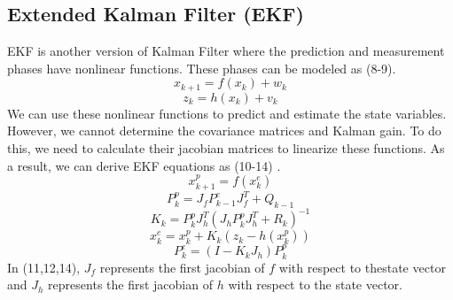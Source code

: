 \documentclass[12pt]{article}
\begin{document}
    \subsection{Extended Kalman Filter (EKF)}
    EKF is another version of Kalman Filter where the prediction and 
    measurement phases have nonlinear functions. These phases can 
    be modeled as (8-9).
    \begin{equation}\label{eq:8}
        x_{k+1} = f(x_k) + w_k
    \end{equation}
    \begin{equation}\label{eq:9}
        z_k = h(x_k) + v_k
    \end{equation}
    We can use these nonlinear functions to predict and estimate 
    the state variables. However, we cannot determine the covariance 
    matrices and Kalman gain. To do this, we need to calculate their 
    jacobian matrices to linearize these functions. As a result, 
    we can derive EKF equations as (10-14) \cite{ekf}.
    \begin{equation}\label{eq:10}
        x^{p}_{k+1} = f(x^{e}_k)
    \end{equation}
    \begin{equation}\label{eq:11}
        P^{p}_{k} = J_fP^{e}_{k-1}J_f^T + Q_{k-1}
    \end{equation}
    \begin{equation}\label{eq:12}
        K_k = P^p_kJ_h^T(J_hP^p_kJ_h^T + R_k)^{-1}	
    \end{equation}
    \begin{equation}\label{eq:13}
        x^{e}_{k} = x^{p}_k + K_k(z_k - h(x^p_k))	
    \end{equation}
    \begin{equation}\label{eq:14}
        P^{e}_{k} = (I - K_kJ_h)P^p_k	
    \end{equation}
    In (11,12,14), \(J_f\) represents the first jacobian of \(f\) with 
    respect to thestate vector and \(J_h\) represents the first jacobian 
    of \(h\) with respect to the state vector.
\end{document}
